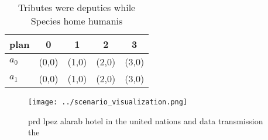 \documentclass[a4paper]{article}
\begin{document}
\begin{table}
\begin{adjustbox}{width=0.7\columnwidth}
\begin{tabular}{|l|l|l|l|l|}
\hline
\textbf{plan} & \multicolumn{1}{c|}{\textbf{0}} & \multicolumn{1}{c|}{\textbf{1}} & \multicolumn{1}{c|}{\textbf{2}} & \multicolumn{1}{c|}{\textbf{3}} \\ \hline
\textbf{$a_0$}  & (0,0) & (1,0) & (2,0) & (3,0) \\ \hline
\textbf{$a_1$}  & (0,0) & (1,0) & (2,0) & (3,0) \\ \hline
\end{tabular}
\end{adjustbox}
\caption{Tributes were deputies while Species home humanis
}
\end{table}

\begin{figure}
\centering
\texttt{[image: ../scenario\_visualization.png]}
\caption{prd lpez alarab hotel in the united nations and data transmission the
}
\end{figure}
 
\end{document}
